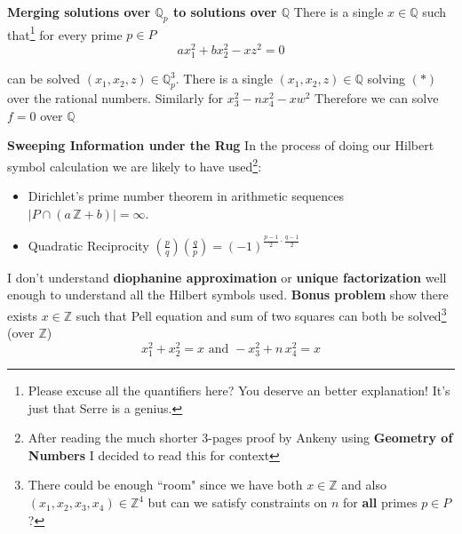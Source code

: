 \documentclass[12pt]{article}
\begin{document}
\newpage

\noindent\textbf{Merging solutions over $\mathbb{Q}_p$ to solutions over $\mathbb{Q}$  }
\newline \newline
\noindent There is a single $x \in \mathbb{Q}$ such that\footnote{Please excuse all the quantifiers here? You deserve an better explanation!  It's just that Serre is a genius.} for every prime $p \in P$
$$a x_1^2 + b x_2^2 - x z^2 = 0 $$ 

\noindent can be solved $(x_1, x_2, z) \in \mathbb{Q}_p^3$.  There is a single $(x_1, x_2, z) \in \mathbb{Q}$ 
\newline \newline
solving $(\ast)$ over the rational numbers.  Similarly for $x_3^2 - n x_4^2 - x w^2$
\newline \newline
Therefore we can solve $f = 0$ over $\mathbb{Q}$

\newpage

\noindent\textbf{Sweeping Information under the Rug  }
\newline \newline
In the process of doing our Hilbert symbol calculation we are likely to have used\footnote{After reading the much shorter 3-pages proof by Ankeny using \textbf{Geometry of Numbers} I decided to read this for context}:
\begin{itemize}
\item Dirichlet's prime number theorem in arithmetic sequences $|P \cap (a \, \mathbb{Z} + b)|=\infty$.
\item Quadratic Reciprocity \hspace{0.75in}$(\frac{p}{q})(\frac{q}{p}) = (-1)^{\frac{p-1}{2}\cdot\frac{q-1}{2}}$
\end{itemize} \vspace{12pt}
I don't understand \textbf{diophanine approximation} or \textbf{unique factorization} well enough to understand all the Hilbert symbols used. 
\newline \newline
\textbf{Bonus problem} show there exists $x \in \mathbb{Z}$ such that Pell equation and sum of two squares can both be solved\footnote{There could be enough ``room" since we have both $x \in \mathbb{Z}$ and also $(x_1, x_2, x_3, x_4)\in \mathbb{Z}^4$ but can we satisfy constraints on $n$ for \textbf{all} primes $p \in P$ ?} (over $\mathbb{Z}$)
$$ x_1^2 + x_2^2 = x \text{ and } -x_3^2 + n \, x_4^2 = x $$
\end{document}
